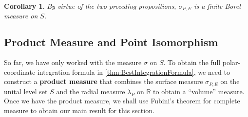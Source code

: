 \documentclass[11pt, letter]{book}
\newtheorem{corollary}[theorem]{Corollary}
\begin{document}
\begin{framed}
\begin{corollary}
By virtue of the two preceding propositions, $\sigma_{P,E}$ is a finite Borel measure on $S$.
\end{corollary}
\end{framed}




\subsection{Product Measure and Point Isomorphism}\label{subsec:ProductMeasure}
So far, we have only worked with the measure $\sigma$ on $S$. To obtain the full polar-coordinate integration formula in \ref{thm:BestIntegrationFormula}, we need to construct a \textbf{product measure} that combines the surface measure $\sigma_{P,E}$ on the unital level set $S$ and the radial measure $\lambda_P$ on $\mathbb{R}$ to obtain a ``volume'' measure. Once we have the product measure, we shall use Fubini's theorem for complete measure to obtain our main result for this section. \\
\end{document}
